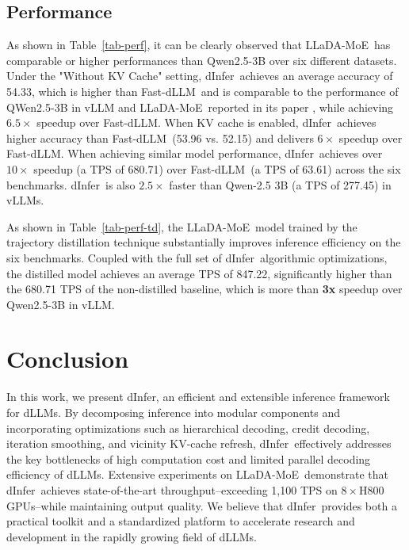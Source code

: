 \documentclass[]{antgroup}
\newcommand{\sys}{dInfer}
\newcommand{\fastdllm}{Fast-dLLM}
\newcommand{\lladamoe}{LLaDA-MoE}
\begin{document}
\subsection{Performance}
As shown in Table~\ref{tab-perf}, it can be clearly observed that \lladamoe~has comparable or higher performances than Qwen2.5-3B over six different datasets.
Under the "Without KV Cache" setting, \sys~achieves an average accuracy of 54.33, which is higher than \fastdllm~and is comparable to the performance of QWen2.5-3B in vLLM and \lladamoe~reported in its paper \citep{zhu2025lladamoe}, while achieving $6.5\times$ speedup over \fastdllm.
When KV cache is enabled, \sys~achieves higher accuracy than \fastdllm~(53.96 vs. 52.15) and delivers $6\times$ speedup over \fastdllm. 
When achieving similar model performance, \sys~achieves over $10 \times$ speedup (a TPS of 680.71) over \fastdllm~(a TPS of 63.61) across the six benchmarks. \sys~is also $2.5 \times$ faster than Qwen-2.5 3B (a TPS of 277.45) in vLLMs.

 As shown in Table~\ref{tab-perf-td}, the \lladamoe~model trained by the trajectory distillation technique substantially improves inference efficiency on the six benchmarks. Coupled with the full set of \sys~algorithmic optimizations, the distilled model achieves an average TPS of 847.22, significantly higher than the 680.71 TPS of the non-distilled baseline, which is more than \textbf{3x} speedup over Qwen2.5-3B in vLLM.


\section{Conclusion}
In this work, we present \sys, an efficient and extensible inference framework for dLLMs. By decomposing inference into modular components and incorporating optimizations such as hierarchical decoding, credit decoding, iteration smoothing, and vicinity KV-cache refresh, \sys~effectively addresses the key bottlenecks of high computation cost and limited parallel decoding efficiency of dLLMs. Extensive experiments on \lladamoe~demonstrate that \sys~achieves state-of-the-art throughput--exceeding 1,100 TPS on $8\times$H800 GPUs--while maintaining output quality. We believe that \sys~provides both a practical toolkit and a standardized platform to accelerate research and development in the rapidly growing field of dLLMs.
\end{document}
